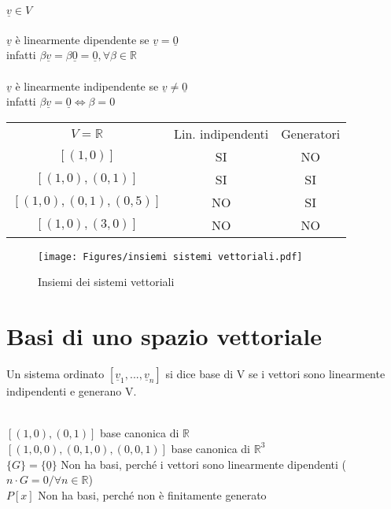   \begin{osservazione}
    $\underline{v}\in V$\\\\
    $\underline{v}$ è linearmente dipendente se $\underline{v}=\underline{0}$\\
    infatti $\beta \underline{v}=\beta \underline{0}=\underline{0},
    \forall\beta\in\mathbb{R}$\\\\
    $\underline{v}$ è linearmente indipendente se $\underline{v}\neq
    \underline{0}$\\
    infatti $\beta \underline{v}=\underline{0}\Longleftrightarrow \beta=0$
  \end{osservazione}

  \begin{center}
    \begin{tabular}{ccc}
      $V=\mathbb{R}$ & Lin. indipendenti & Generatori \\
      $[(1,0)]$ &                SI & NO \\
      $[(1,0),(0,1)]$ &                SI & SI \\
      $[(1,0),(0,1),(0,5)]$ &                NO & SI \\
      $[(1,0),(3,0)]$ &                NO & NO \\
    \end{tabular}
  \end{center}

  \begin{figure}[H]
    \centering
    \texttt{[image: Figures/insiemi sistemi
    vettoriali.pdf]}
    \caption[Caption]{Insiemi dei sistemi vettoriali}
    \label{fig:insiemisistemivett}
  \end{figure}

  \section{Basi di uno spazio vettoriale}

  Un sistema ordinato $[\underline{v}_1,...,\underline{v}_n]$ si dice
  base di V se i vettori sono linearmente indipendenti e generano V.
  \begin{nota}
    \phantom{}\\
    $[(1,0),(0,1)]$ base canonica di $\mathbb{R}$\\
    $[(1,0,0),(0,1,0),(0,0,1)]$ base canonica di $\mathbb{R}^3$\\
    $\{G\}=\{\underline{0}\}$ Non ha basi, perché i vettori sono
    linearmente dipendenti ($n\cdot G=0/\forall n\in \mathbb{R}$)\\
    $P[x]$ Non ha basi, perché non è finitamente generato
  \end{nota}

